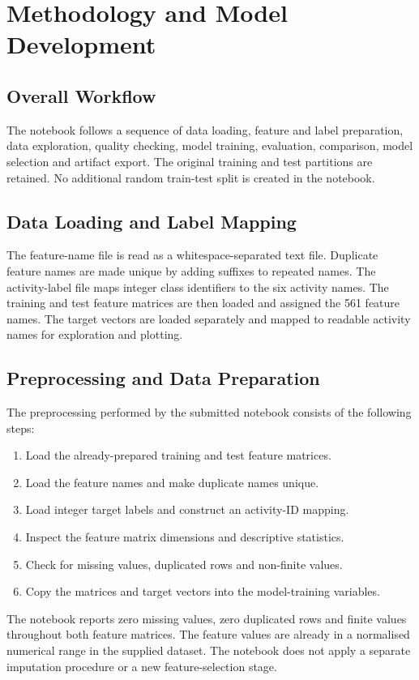 \chapter{Methodology and Model Development}
\section{Overall Workflow}
The notebook follows a sequence of data loading, feature and label preparation, data exploration, quality checking, model training, evaluation, comparison, model selection and artifact export. The original training and test partitions are retained. No additional random train-test split is created in the notebook.

\section{Data Loading and Label Mapping}
The feature-name file is read as a whitespace-separated text file. Duplicate feature names are made unique by adding suffixes to repeated names. The activity-label file maps integer class identifiers to the six activity names. The training and test feature matrices are then loaded and assigned the 561 feature names. The target vectors are loaded separately and mapped to readable activity names for exploration and plotting.

\section{Preprocessing and Data Preparation}
The preprocessing performed by the submitted notebook consists of the following steps:
\begin{enumerate}
\item Load the already-prepared training and test feature matrices.
\item Load the feature names and make duplicate names unique.
\item Load integer target labels and construct an activity-ID mapping.
\item Inspect the feature matrix dimensions and descriptive statistics.
\item Check for missing values, duplicated rows and non-finite values.
\item Copy the matrices and target vectors into the model-training variables.
\end{enumerate}

The notebook reports zero missing values, zero duplicated rows and finite values throughout both feature matrices. The feature values are already in a normalised numerical range in the supplied dataset. The notebook does not apply a separate imputation procedure or a new feature-selection stage.


